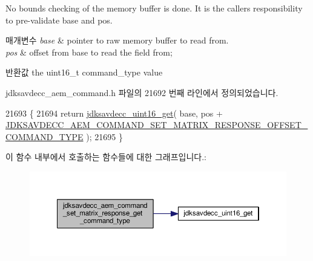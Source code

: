 No bounds checking of the memory buffer is done. It is the caller\textquotesingle{}s responsibility to pre-\/validate base and pos.


\begin{DoxyParams}{매개변수}
{\em base} & pointer to raw memory buffer to read from. \\
\hline
{\em pos} & offset from base to read the field from; \\
\hline
\end{DoxyParams}
\begin{DoxyReturn}{반환값}
the uint16\+\_\+t command\+\_\+type value 
\end{DoxyReturn}


jdksavdecc\+\_\+aem\+\_\+command.\+h 파일의 21692 번째 라인에서 정의되었습니다.


\begin{DoxyCode}
21693 \{
21694     \textcolor{keywordflow}{return} \hyperlink{group__endian_ga3fbbbc20be954aa61e039872965b0dc9}{jdksavdecc\_uint16\_get}( base, pos + 
      \hyperlink{group__command__set__matrix__response_ga9589391f6659b38fd4a521a3961d15ce}{JDKSAVDECC\_AEM\_COMMAND\_SET\_MATRIX\_RESPONSE\_OFFSET\_COMMAND\_TYPE}
       );
21695 \}
\end{DoxyCode}


이 함수 내부에서 호출하는 함수들에 대한 그래프입니다.\+:
\nopagebreak
\begin{figure}[H]
\begin{center}
\leavevmode
\includegraphics[width=350pt]{group__command__set__matrix__response_ga625136ddf84ec31bb1be2e1d54247956_cgraph}
\end{center}
\end{figure}



